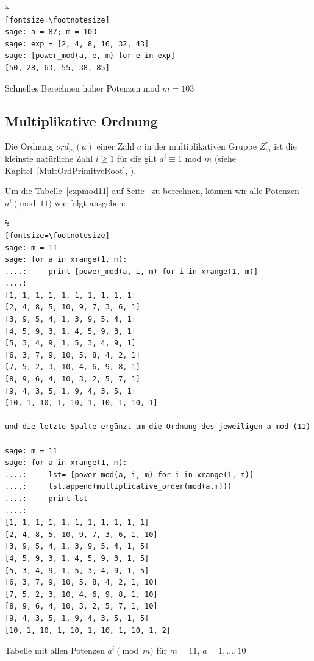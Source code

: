 \begin{refsegment}
\begin{sagecode}
\begin{Verbatim}%
[fontsize=\footnotesize]
sage: a = 87; m = 103
sage: exp = [2, 4, 8, 16, 32, 43]
sage: [power_mod(a, e, m) for e in exp]
[50, 28, 63, 55, 38, 85]
\end{Verbatim}
\caption{Schnelles Berechnen hoher Potenzen mod $m = 103$}
\end{sagecode}


\newpage
\hypertarget{nt:AppArith3a1}{}
\subsection{Multiplikative Ordnung}
\label{nt:AppArith3a1}{}

Die Ordnung $ord_m(a)$ einer Zahl $a$ in der multiplikativen Gruppe $Z_m^*$ ist
die kleinste natürliche Zahl $i \ge 1$ für die gilt $a^i \equiv 1$ mod $m$
(siehe Kapitel~\ref{MultOrdPrimitveRoot}, \glqq {}\grqq).

Um die Tabelle~\ref{expmod11} auf Seite~\pageref{SrcArith3a} zu berechnen,
können wir alle Potenzen $a^i \pmod{11}$ wie folgt ausgeben:

\begin{sagecode}
\begin{Verbatim}%
[fontsize=\footnotesize]
sage: m = 11
sage: for a in xrange(1, m):
....:     print [power_mod(a, i, m) for i in xrange(1, m)]
....:
[1, 1, 1, 1, 1, 1, 1, 1, 1, 1]
[2, 4, 8, 5, 10, 9, 7, 3, 6, 1]
[3, 9, 5, 4, 1, 3, 9, 5, 4, 1]
[4, 5, 9, 3, 1, 4, 5, 9, 3, 1]
[5, 3, 4, 9, 1, 5, 3, 4, 9, 1]
[6, 3, 7, 9, 10, 5, 8, 4, 2, 1]
[7, 5, 2, 3, 10, 4, 6, 9, 8, 1]
[8, 9, 6, 4, 10, 3, 2, 5, 7, 1]
[9, 4, 3, 5, 1, 9, 4, 3, 5, 1]
[10, 1, 10, 1, 10, 1, 10, 1, 10, 1]

und die letzte Spalte ergänzt um die Ordnung des jeweiligen a mod (11)

sage: m = 11
sage: for a in xrange(1, m):
....:     lst= [power_mod(a, i, m) for i in xrange(1, m)]
....:     lst.append(multiplicative_order(mod(a,m)))
....:     print lst
....:
[1, 1, 1, 1, 1, 1, 1, 1, 1, 1, 1]
[2, 4, 8, 5, 10, 9, 7, 3, 6, 1, 10]
[3, 9, 5, 4, 1, 3, 9, 5, 4, 1, 5]
[4, 5, 9, 3, 1, 4, 5, 9, 3, 1, 5]
[5, 3, 4, 9, 1, 5, 3, 4, 9, 1, 5]
[6, 3, 7, 9, 10, 5, 8, 4, 2, 1, 10]
[7, 5, 2, 3, 10, 4, 6, 9, 8, 1, 10]
[8, 9, 6, 4, 10, 3, 2, 5, 7, 1, 10]
[9, 4, 3, 5, 1, 9, 4, 3, 5, 1, 5]
[10, 1, 10, 1, 10, 1, 10, 1, 10, 1, 2]
\end{Verbatim}
\caption{Tabelle mit allen Potenzen $a^i \pmod{m}$ für $m=11$, $a=1,...,10$}
\label{nt_Sage-code_MultOrder_expmod11}%
\end{sagecode}



\end{refsegment}
